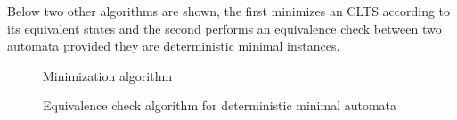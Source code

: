 Below two other algorithms are shown, the first minimizes an CLTS according to its equivalent states and the second performs an equivalence check between two automata provided they are deterministic minimal instances.

\begin{figure}[H]
	\begin{center}
		 
		\caption{Minimization algorithm}
		\label{fig:fda-adaptation}
	\end{center}
\end{figure}

\begin{figure}[H]
	\begin{center}
		 
		\caption{Equivalence check algorithm for deterministic minimal automata}
		\label{fig:equivalence-check}
	\end{center}
\end{figure}

%		 
